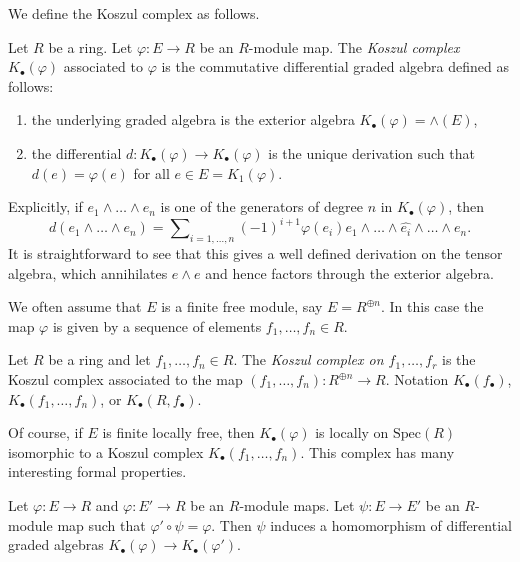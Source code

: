\noindent
We define the Koszul complex as follows.

\begin{definition}
\label{definition-koszul}
Let $R$ be a ring. Let $\varphi : E \to R$ be an $R$-module map. The 
{\it Koszul complex} $K_\bullet(\varphi)$ associated to $\varphi$
is the commutative differential graded algebra defined as follows:
\begin{enumerate}
\item the underlying graded algebra is the exterior algebra
$K_\bullet(\varphi) = \wedge(E)$,
\item the differential $d : K_\bullet(\varphi) \to K_\bullet(\varphi)$
is the unique derivation such that $d(e) = \varphi(e)$ for all
$e \in E = K_1(\varphi)$.
\end{enumerate}
\end{definition}

\noindent
Explicitly, if $e_1 \wedge \ldots \wedge e_n$ is one of the generators of
degree $n$ in $K_\bullet(\varphi)$, then
$$
d(e_1 \wedge \ldots \wedge e_n) =
\sum\nolimits_{i = 1, \ldots, n} (-1)^{i + 1}
\varphi(e_i)e_1 \wedge \ldots \wedge \widehat{e_i} \wedge \ldots \wedge e_n.
$$
It is straightforward to see that this gives a well defined derivation
on the tensor algebra, which annihilates $e \wedge e$ and hence factors
through the exterior algebra.

\medskip\noindent
We often assume that $E$ is a finite free module, say $E = R^{\oplus n}$.
In this case the map $\varphi$ is given by a sequence of elements
$f_1, \ldots, f_n \in R$.

\begin{definition}
\label{definition-koszul-complex}
Let $R$ be a ring and let $f_1, \ldots, f_n \in R$. The
{\it Koszul complex on $f_1, \ldots, f_r$} is the Koszul complex
associated to the map $(f_1, \ldots, f_n) : R^{\oplus n} \to R$.
Notation $K_\bullet(f_\bullet)$, $K_\bullet(f_1, \ldots, f_n)$,
or $K_\bullet(R, f_\bullet)$.
\end{definition}

\noindent
Of course, if $E$ is finite locally free, then $K_\bullet(\varphi)$ is
locally on $\text{Spec}(R)$ isomorphic to a Koszul complex
$K_\bullet(f_1, \ldots, f_n)$.
This complex has many interesting formal properties.

\begin{lemma}
\label{lemma-functorial}
Let $\varphi : E \to R$ and $\varphi : E' \to R$ be an $R$-module maps.
Let $\psi : E \to E'$ be an $R$-module map such that
$\varphi' \circ \psi = \varphi$. Then $\psi$ induces a
homomorphism of differential graded algebras
$K_\bullet(\varphi) \to K_\bullet(\varphi')$.
\end{lemma}

